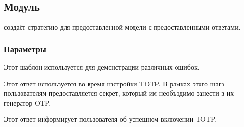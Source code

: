 \subsection{Модуль }\label{page-FPauth-strategies-module-FPauth+u+strategies-module-TOTP-module-Make}%
 создаёт стратегию для предоставленной модели с предоставленными ответами.

\subsubsection{Параметры\label{parameters}}%
\label{page-FPauth-strategies-module-FPauth+u+strategies-module-TOTP-module-Make-argument-1-R}\begin{ocamlindent}\label{page-FPauth-strategies-module-FPauth+u+strategies-module-TOTP-module-Make-argument-1-R-val-response+u+error}\begin{ocamlindent}Этот шаблон используется для демонстрации различных ошибок.\end{ocamlindent}%
\medbreak
\label{page-FPauth-strategies-module-FPauth+u+strategies-module-TOTP-module-Make-argument-1-R-val-response+u+secret}\begin{ocamlindent}Этот ответ используется во время настройки TOTP. В рамках этого шага пользователям предоставляется секрет, который им необъодимо занести в их генератор OTP.\end{ocamlindent}%
\medbreak
\label{page-FPauth-strategies-module-FPauth+u+strategies-module-TOTP-module-Make-argument-1-R-val-response+u+enabled}\begin{ocamlindent}Этот ответ информирует пользователя об успешном включении TOTP.\end{ocamlindent}%
\medbreak
\end{ocamlindent}%
